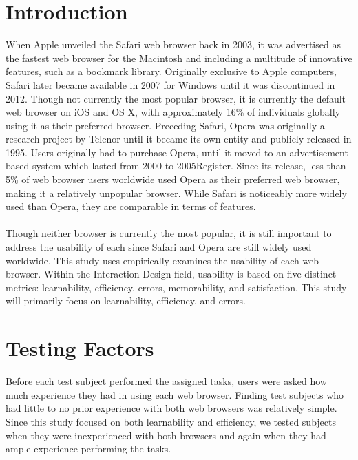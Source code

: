 \documentclass{article}
\begin{document}
\section{Introduction} When Apple unveiled the Safari web browser back in 2003, it was advertised as the fastest web browser for the Macintosh and including a multitude of innovative features, such as a bookmark library\cite{Safari}. Originally exclusive to Apple computers, Safari later became available in 2007 for Windows until it was discontinued in 2012. Though not currently the most popular browser, it is currently the default web browser on iOS and OS X, with approximately 16\% of individuals globally using it as their preferred browser\cite{W3}. Preceding Safari, Opera was originally a research project by Telenor until it became its own entity and publicly released in 1995\cite{About}. Users originally had to purchase Opera, until it moved to an advertisement based system which lasted from 2000 to 2005{Register}. Since its release, less than 5\% of web browser users worldwide used Opera as their preferred web browser, making it a relatively unpopular browser\cite{Opera}. While Safari is noticeably more widely used than Opera, they are comparable in terms of features.\\
\\
\indent Though neither browser is currently the most popular, it is still important to address the usability of each since Safari and Opera are still widely used worldwide. This study uses empirically examines the usability of each web browser. Within the Interaction Design field, usability is based on five distinct metrics: learnability, efficiency, errors, memorability, and satisfaction. This study will primarily focus on learnability, efficiency, and errors\cite{Nielsen}.

\section{Testing Factors} Before each test subject performed the assigned tasks, users were asked how much experience they had in using each web browser. Finding test subjects who had little to no prior experience with both web browsers was relatively simple. Since this study focused on both learnability and efficiency, we tested subjects when they were inexperienced with both browsers and again when they had ample experience performing the tasks.
\end{document}
